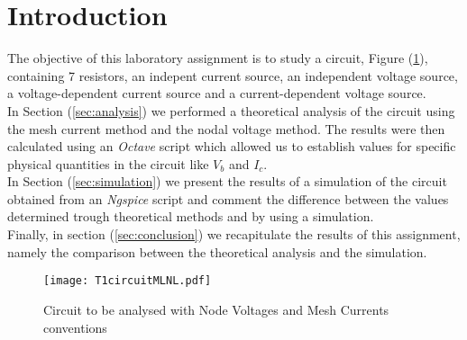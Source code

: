 \clearpage

\section{Introduction}
\label{sec:introduction}

The objective of this laboratory assignment is to study a circuit, Figure (\ref{fig:1}),
containing 7 resistors, an indepent current source, an independent voltage source, a voltage-dependent
current source and a current-dependent voltage source.
\\
In Section (\ref{sec:analysis}) we performed a theoretical analysis of the circuit using the mesh current method
and the nodal voltage method. The results were then calculated using an \emph{Octave} script which allowed us
to establish values for specific physical quantities in the circuit like $V_b$ and $I_c$.
\\
In Section (\ref{sec:simulation}) we present the results of a simulation of the circuit obtained from an
\emph{Ngspice} script and comment the difference between the values determined trough theoretical methods and
by using a simulation.
\\
Finally, in section (\ref{sec:conclusion}) we recapitulate the results of this assignment, namely the comparison between
the theoretical analysis and the simulation.

\begin{figure}[h] \centering
    \texttt{[image: T1circuitMLNL.pdf]}
    \caption{Circuit to be analysed with Node Voltages and Mesh Currents conventions}
    \label{fig:1}
\end{figure}
